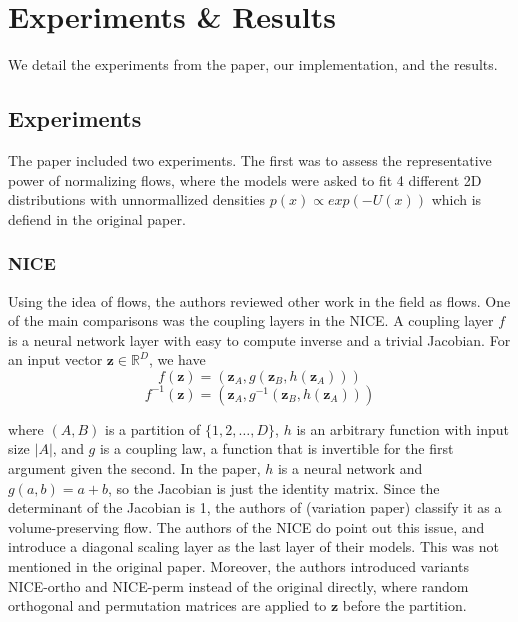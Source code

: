 \chapter{Experiments \& Results}

We detail the experiments from the paper, our implementation, and the results.

\section{Experiments}

The paper included two experiments. The first was to assess the representative power of normalizing flows, where the models were asked to fit 4 different 2D distributions with unnormallized densities $p(x) \propto exp(-U(x))$ which is defiend in the original paper.

\subsection{NICE}

Using the idea of flows, the authors reviewed other work in the field as flows. One of the main comparisons was the coupling layers in the NICE. A coupling layer $f$ is a neural network layer with easy to compute inverse and a trivial Jacobian. For an input vector $\mathbf{z} \in \mathbb{R}^D$, we have
\begin{equation}
f(\mathbf{z}) = (\mathbf{z}_A, g(\mathbf{z}_B,h(\mathbf{z}_A))) 
\end{equation}
\begin{equation}
f^{-1}(\mathbf{z}) = (\mathbf{z}_A, g^{-1}(\mathbf{z}_B,h(\mathbf{z}_A)))
\end{equation}

where $(A,B)$ is a partition of $\{1,2,\dots,D\}$, $h$ is an arbitrary function with input size $|A|$, and $g$ is a coupling law, a function that is invertible for the first argument given the second. In the paper, $h$ is a neural network and $g(a,b)=a+b$, so the Jacobian is just the identity matrix. Since the determinant of the Jacobian is 1, the authors of (variation paper) classify it as a volume-preserving flow.
The authors of the NICE do point out this issue, and introduce a diagonal scaling layer as the last layer of their models. This was not mentioned in the original paper. Moreover, the authors introduced variants NICE-ortho and NICE-perm instead of the original directly, where random orthogonal and permutation matrices are applied to $\mathbf{z}$ before the partition. 

